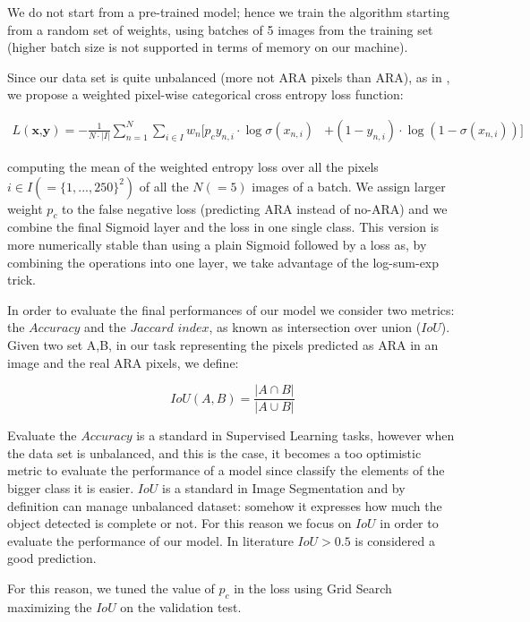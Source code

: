\documentclass[9pt,conference,compsocconf]{IEEEtran}
\begin{document}
We do not start from a pre-trained model; hence we train the algorithm starting from a random set of
weights, using batches of 5 images from the training set (higher batch size is not supported in terms of memory on our machine).

Since our data set is quite unbalanced (more not ARA pixels than ARA), as in  \cite{castello2019deep}, we propose a weighted pixel-wise categorical cross entropy loss function: 

\begin{multline}
    L(\textbf{x,y}) = - \frac{1}{N \cdot |I|} \sum_{n=1}^{N} \sum_{i  \in I} w_n [ p_c y_{n,i} \cdot \log \sigma(x_{n,i}) & + (1 - y_{n,i}) \cdot \log (1 - \sigma(x_{n,i})) ]
\end{multline}

computing the mean of the weighted entropy loss over all the pixels $i \in I (= \{1,..., 250\}^2)$ of all the $N(=5)$ images of a batch. We assign larger weight $p_c$ to the false negative loss (predicting ARA instead of no-ARA) and we combine the final Sigmoid layer and the loss in one single class. This version is more numerically stable \cite{BCEWITHLOGITSLOSS:2019} than using a plain Sigmoid followed by a loss as, by combining the operations into one layer, we take advantage of the log-sum-exp trick.

In order to evaluate the final performances of our model we consider two metrics: the $Accuracy$ and  the $Jaccard$ $index$, as known as intersection over union ($IoU$). Given two set A,B, in our task representing the pixels predicted as ARA in an image and the real ARA pixels, we define:

$$
IoU(A,B)=\frac{|A \cap B|}{|A \cup B|}
$$


Evaluate the $Accuracy$ is a standard in Supervised Learning tasks, however when the data set is unbalanced, and this is the case, it becomes a too optimistic metric to evaluate the performance of a model since classify the elements of the bigger class it is easier. $IoU$ is a standard in Image Segmentation and by definition can manage unbalanced dataset: somehow it expresses how much the object detected is complete or not. For this reason we focus on $IoU$ in order to evaluate the performance of our model. In literature $IoU>0.5$ is considered a good prediction. 

For this reason, we tuned the value of $p_c$ in the loss using Grid Search maximizing the $IoU$ on the validation test.
\end{document}
